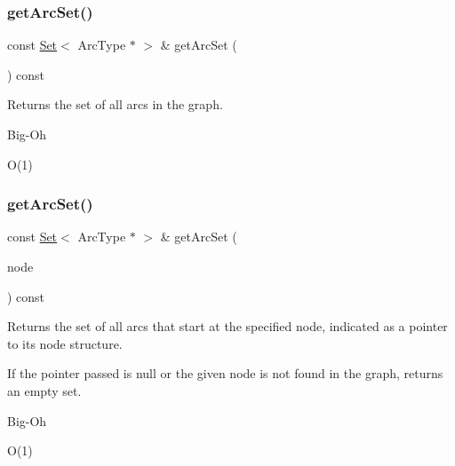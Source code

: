 \subsubsection{\texorpdfstring{get\+Arc\+Set()}{getArcSet()}\hspace{0.1cm}{\footnotesize\ttfamily [1/3]}}
{\footnotesize\ttfamily const \mbox{\hyperlink{classstanfordcpplib_1_1collections_1_1GenericSet}{Set}}$<$ Arc\+Type $\ast$ $>$ \& get\+Arc\+Set (\begin{DoxyParamCaption}{ }\end{DoxyParamCaption}) const}



Returns the set of all arcs in the graph. 

\begin{DoxyRefDesc}{Big-\/\+Oh}
\item[\mbox{\hyperlink{BigOh__BigOh000062}{Big-\/\+Oh}}]O(1) \end{DoxyRefDesc}
\mbox{\label{classGraph_a17cfc7f4d8c738fc6f51813f50be6400}} 
\subsubsection{\texorpdfstring{get\+Arc\+Set()}{getArcSet()}\hspace{0.1cm}{\footnotesize\ttfamily [2/3]}}
{\footnotesize\ttfamily const \mbox{\hyperlink{classstanfordcpplib_1_1collections_1_1GenericSet}{Set}}$<$ Arc\+Type $\ast$ $>$ \& get\+Arc\+Set (\begin{DoxyParamCaption}\item[{Node\+Type $\ast$}]{node }\end{DoxyParamCaption}) const}



Returns the set of all arcs that start at the specified node, indicated as a pointer to its node structure. 

If the pointer passed is null or the given node is not found in the graph, returns an empty set. \begin{DoxyRefDesc}{Big-\/\+Oh}
\item[\mbox{\hyperlink{BigOh__BigOh000063}{Big-\/\+Oh}}]O(1) \end{DoxyRefDesc}
\mbox{\label{classGraph_a31b9e2056ee2d66a7ea9feb02f016e8d}} 
